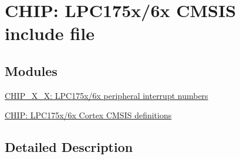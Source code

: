 \hypertarget{group___c_m_s_i_s__175_x__6_x}{\section{C\+H\+I\+P\+: L\+P\+C175x/6x C\+M\+S\+I\+S include file}
\label{group___c_m_s_i_s__175_x__6_x}
}
\subsection*{Modules}
\begin{DoxyCompactItemize}
\item 
\hyperlink{group___c_m_s_i_s__175_x__6_x___i_r_q}{C\+H\+I\+P\+\_\+X\+\_\+X\+: L\+P\+C175x/6x peripheral interrupt numbers}
\item 
\hyperlink{group___c_m_s_i_s__175_x__6_x___c_o_m_m_o_n}{C\+H\+I\+P\+: L\+P\+C175x/6x Cortex C\+M\+S\+I\+S definitions}
\end{DoxyCompactItemize}


\subsection{Detailed Description}
